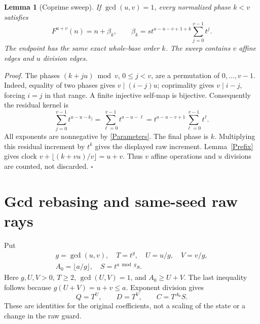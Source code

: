 \documentclass[11pt,letterpaper]{article}
\newtheorem{lemma}[theorem]{Lemma}
\newenvironment{proof}{\noindent\textit{Proof.}}{\hfill\(\square\)}
\begin{document}
\begin{lemma}[Coprime sweep]\label{Sweep}
If \(\gcd(u,v)=1\), every normalized phase \(k<v\) satisfies
\[
F^{u+v}(n)=n+\beta_k,\qquad
\beta_k=s t^{a-u-v+1+k}\sum_{j=0}^{v-1}t^j.
\]
The endpoint has the same exact whole-base order \(k\). The sweep contains
\(v\) affine edges and \(u\) division edges.
\end{lemma}
\begin{proof}
The phases \((k+ju)\bmod v\), \(0\le j<v\), are a permutation of
\(0,\ldots,v-1\). Indeed, equality of two phases gives
\(v\mid(i-j)u\); coprimality gives \(v\mid i-j\), forcing \(i=j\) in that range.
A finite injective self-map is bijective. Consequently the residual kernel is
\[
\sum_{j=0}^{v-1}t^{a-u-k_j}
=\sum_{\ell=0}^{v-1}t^{a-u-\ell}
=t^{a-u-v+1}\sum_{\ell=0}^{v-1}t^\ell.
\]
All exponents are nonnegative by \eqref{Parameters}. The final phase is \(k\).
Multiplying this residual increment by \(t^k\) gives the displayed raw increment.
Lemma~\ref{Prefix} gives clock \(v+\lfloor(k+vu)/v\rfloor=u+v\).
Thus \(v\) affine operations and \(u\) divisions are counted, not discarded.
\end{proof}

\section{Gcd rebasing and same-seed raw rays}

Put
\begin{equation}\label{Rebase}
\begin{gathered}
g=\gcd(u,v),\quad T=t^g,\quad U=u/g,\quad V=v/g,\\
A_0=\lfloor a/g\rfloor,\quad S=t^{a\bmod g}s.
\end{gathered}
\end{equation}
Here \(g,U,V>0\), \(T\ge2\), \(\gcd(U,V)=1\), and \(A_0\ge U+V\).
The last inequality follows because \(g(U+V)=u+v\le a\).
Exponent division gives
\[
Q=T^U,\qquad D=T^V,\qquad C=T^{A_0}S.
\]
These are identities for the original coefficients, not a scaling of the state
or a change in the raw guard.
\end{document}
